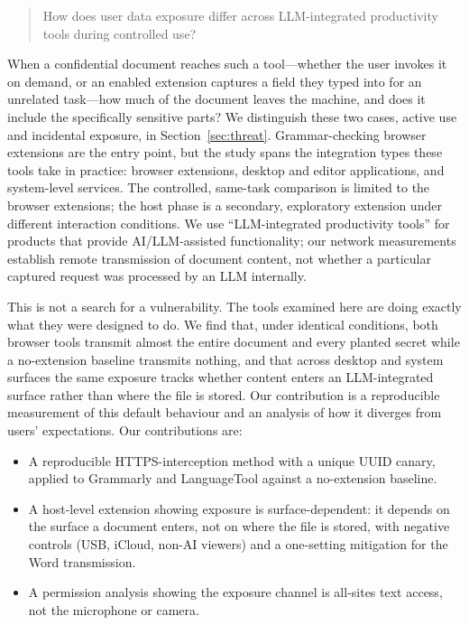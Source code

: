 \documentclass[10pt,conference,a4paper]{IEEEtran}
\begin{document}
\begin{quote}
How does user data exposure differ across LLM-integrated productivity tools
during controlled use?
\end{quote}

When a confidential document reaches such a tool---whether the user invokes it on demand,
or an enabled extension captures a field they typed into for an unrelated task---how much of
the document leaves the machine, and does it include the specifically sensitive parts? We
distinguish these two cases, active use and incidental exposure, in
Section~\ref{sec:threat}. Grammar-checking browser
extensions are the entry point, but the study spans the integration types these tools take
in practice: browser extensions, desktop and editor applications, and system-level
services. The controlled, same-task comparison is limited to the browser extensions; the
host phase is a secondary, exploratory extension under different interaction conditions.
We use ``LLM-integrated productivity tools'' for products that provide AI/LLM-assisted
functionality; our network measurements establish remote transmission of document content,
not whether a particular captured request was processed by an LLM internally.

This is not a search for a vulnerability. The tools examined here are doing exactly
what they were designed to do. We find that, under identical conditions, both browser tools
transmit almost the entire document and every planted secret while a no-extension baseline
transmits nothing, and that across desktop and system surfaces the same exposure tracks
whether content enters an LLM-integrated surface rather than where the file is stored. Our
contribution is a reproducible measurement of this default behaviour and an analysis of how
it diverges from users' expectations. Our contributions are:

\begin{itemize}[nosep]
  \item A reproducible HTTPS-interception method with a unique UUID canary, applied to
        Grammarly and LanguageTool against a no-extension baseline.
  \item A host-level extension showing exposure is surface-dependent: it depends on the
        surface a document enters, not on where the file is stored, with negative controls
        (USB, iCloud, non-AI viewers) and a one-setting mitigation for the Word transmission.
  \item A permission analysis showing the exposure channel is all-sites text access, not
        the microphone or camera.
\end{itemize}
\end{document}
